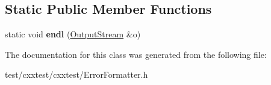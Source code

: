 \subsection*{Static Public Member Functions}
\begin{DoxyCompactItemize}
\item 
\hypertarget{classCxxTest_1_1OutputStream_ac87f8253aceba7da987d9a183c816789}{static void {\bfseries endl} (\hyperlink{classCxxTest_1_1OutputStream}{Output\-Stream} \&o)}\label{classCxxTest_1_1OutputStream_ac87f8253aceba7da987d9a183c816789}

\end{DoxyCompactItemize}


The documentation for this class was generated from the following file\-:\begin{DoxyCompactItemize}
\item 
test/cxxtest/cxxtest/Error\-Formatter.\-h\end{DoxyCompactItemize}

